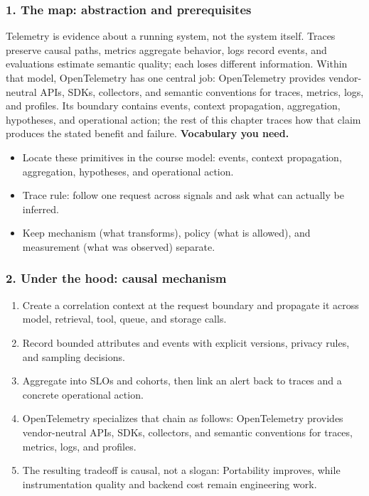 \subsubsection*{1. The map: abstraction and prerequisites}
Telemetry is evidence about a running system, not the system itself. Traces preserve causal paths, metrics aggregate behavior, logs record events, and evaluations estimate semantic quality; each loses different information.
Within that model, OpenTelemetry has one central job: OpenTelemetry provides vendor-neutral APIs, SDKs, collectors, and semantic conventions for traces, metrics, logs, and profiles. Its boundary contains events, context propagation, aggregation, hypotheses, and operational action; the rest of this chapter traces how that claim produces the stated benefit and failure.
\textbf{Vocabulary you need.}\begin{itemize}
\item Locate these primitives in the course model: events, context propagation, aggregation, hypotheses, and operational action.
\item Trace rule: follow one request across signals and ask what can actually be inferred.
\item Keep mechanism (what transforms), policy (what is allowed), and measurement (what was observed) separate.
\end{itemize}
\subsubsection*{2. Under the hood: causal mechanism}\begin{enumerate}
\item Create a correlation context at the request boundary and propagate it across model, retrieval, tool, queue, and storage calls.
\item Record bounded attributes and events with explicit versions, privacy rules, and sampling decisions.
\item Aggregate into SLOs and cohorts, then link an alert back to traces and a concrete operational action.
\item OpenTelemetry specializes that chain as follows: OpenTelemetry provides vendor-neutral APIs, SDKs, collectors, and semantic conventions for traces, metrics, logs, and profiles.
\item The resulting tradeoff is causal, not a slogan: Portability improves, while instrumentation quality and backend cost remain engineering work.
\end{enumerate}
